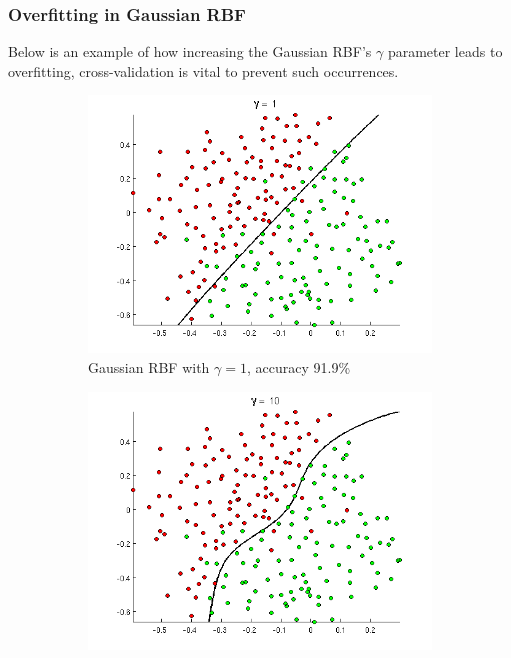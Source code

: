 \subsubsection{Overfitting in Gaussian RBF}
Below is an example of how increasing the Gaussian RBF's $\gamma$ parameter leads to overfitting, cross-validation is vital to prevent such occurrences.
\begin{figure}[H]
\centering
\begin{subfigure}{.5\textwidth}
  \centering
  \includegraphics[width=.95\linewidth]{img/rbf1.png}
  \caption{Gaussian RBF with $\gamma = 1$, accuracy 91.9\%}
  \label{fig:rbf1}
\end{subfigure}%
\begin{subfigure}{.5\textwidth}
  \centering
  \includegraphics[width=.95\linewidth]{img/rbf2.png}

\end{subfigure}
\end{figure}
